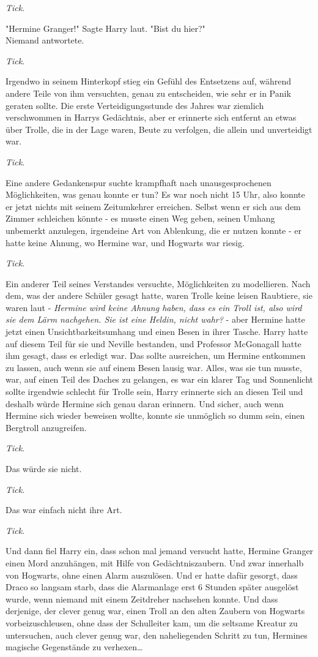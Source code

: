 {\emph{Tick}.

"Hermine Granger!" Sagte Harry laut. "Bist du hier?"\\ Niemand antwortete.

\emph{Tick}.

Irgendwo in seinem Hinterkopf stieg ein Gefühl des Entsetzens auf, während andere Teile von ihm versuchten, genau zu entscheiden, wie sehr er in Panik geraten sollte. Die erste Verteidigungsstunde des Jahres war ziemlich verschwommen in Harrys Gedächtnis, aber er erinnerte sich entfernt an etwas über Trolle, die in der Lage waren, Beute zu verfolgen, die allein und unverteidigt war.

\emph{Tick}.

Eine andere Gedankenspur suchte krampfhaft nach unausgesprochenen Möglichkeiten, was genau konnte er tun? Es war noch nicht 15 Uhr, also konnte er jetzt nichts mit seinem Zeitumkehrer erreichen. Selbst wenn er sich aus dem Zimmer schleichen könnte - es musste einen Weg geben, seinen Umhang unbemerkt anzulegen, irgendeine Art von Ablenkung, die er nutzen konnte - er hatte keine Ahnung, wo Hermine war, und Hogwarts war riesig.

\emph{Tick}.

Ein anderer Teil seines Verstandes versuchte, Möglichkeiten zu modellieren. Nach dem, was der andere Schüler gesagt hatte, waren Trolle keine leisen Raubtiere, sie waren laut - \emph{Hermine wird keine Ahnung haben, dass es ein Troll ist, also wird sie dem Lärm nachgehen. Sie ist eine Heldin, nicht wahr?} - aber Hermine hatte jetzt einen Unsichtbarkeitsumhang und einen Besen in ihrer Tasche. Harry hatte auf diesem Teil für sie und Neville bestanden, und Professor McGonagall hatte ihm gesagt, dass es erledigt war. Das sollte ausreichen, um Hermine entkommen zu lassen, auch wenn sie auf einem Besen lausig war. Alles, was sie tun musste, war, auf einen Teil des Daches zu gelangen, es war ein klarer Tag und Sonnenlicht sollte irgendwie schlecht für Trolle sein, Harry erinnerte sich an diesen Teil und deshalb würde Hermine sich genau daran erinnern. Und sicher, auch wenn Hermine sich wieder beweisen wollte, konnte sie unmöglich so dumm sein, einen Bergtroll anzugreifen.

\emph{Tick}.

Das würde sie nicht.

\emph{Tick}.

Das war einfach nicht ihre Art.

\emph{Tick}.

Und dann fiel Harry ein, dass schon mal jemand versucht hatte, Hermine Granger einen Mord anzuhängen, mit Hilfe von Gedächtniszaubern. Und zwar innerhalb von Hogwarts, ohne einen Alarm auszulösen. Und er hatte dafür gesorgt, dass Draco so langsam starb, dass die Alarmanlage erst 6 Stunden später ausgelöst wurde, wenn niemand mit einem Zeitdreher nachsehen konnte. Und dass derjenige, der clever genug war, einen Troll an den alten Zaubern von Hogwarts vorbeizuschleusen, ohne dass der Schulleiter kam, um die seltsame Kreatur zu untersuchen, auch clever genug war, den naheliegenden Schritt zu tun, Hermines magische Gegenstände zu verhexen…

}

